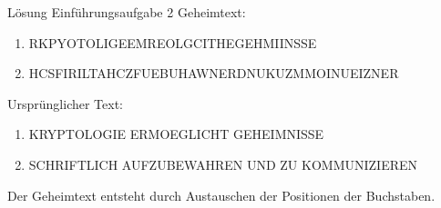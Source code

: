 \begin{frame}[label=intro2Sol]{Lösung Einführungsaufgabe 2}
    Geheimtext:
    \begin{center}
    \small
        \begin{enumerate}
            \item RKPYOTOLIGEEMREOLGCITHEGEHMIINSSE
            \item HCSFIRILTAHCZFUEBUHAWNERDNUKUZMMOINUEIZNER
        \end{enumerate}
        \normalsize
    \end{center}
    Ursprünglicher Text:
    \begin{center}
    \small
        \begin{enumerate}
            \item KRYPTOLOGIE ERMOEGLICHT GEHEIMNISSE
            \item SCHRIFTLICH AUFZUBEWAHREN UND ZU KOMMUNIZIEREN
        \end{enumerate}
        \normalsize
    \end{center}
    Der Geheimtext entsteht durch Austauschen der Positionen der Buchstaben.
    \begin{figure}[H]
        \centering
        \begin{subfigure}[b]{0.45\textwidth}
\end{subfigure}
\end{figure}
\end{frame}
